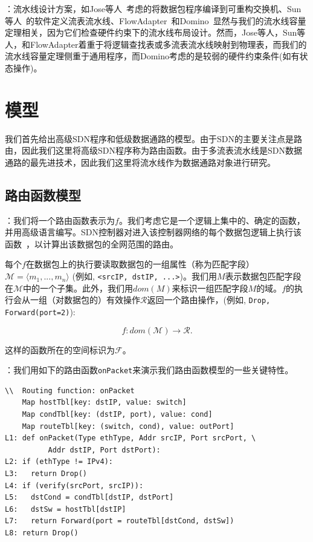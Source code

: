 ：流水线设计方案，如Jose等人~\cite{Jose-et-al}考虑的将数据包程序编译到可重构交换机、Sun等人~\cite{Sun-et-al}的软件定义流表流水线、FlowAdapter~\cite{pan2013flowadapter}和Domino~\cite{sivaraman2016packet}显然与我们的流水线容量定理相关，因为它们检查硬件约束下的流水线布局设计。然而，Jose等人，Sun等人，和FlowAdapter着重于将逻辑查找表或多流表流水线映射到物理表，而我们的流水线容量定理侧重于通用程序，而Domino考虑的是较弱的硬件约束条件(如有状态操作)。


\section{模型}
\label{sec:model-and-main-results}

我们首先给出高级SDN程序和低级数据通路的模型。由于SDN的主要关注点是路由，因此我们这里将高级SDN程序称为路由函数。由于多流表流水线是SDN数据通路的最先进技术，因此我们这里将流水线作为数据通路对象进行研究。

\subsection{路由函数模型}
\label{subsec:function-model}

：我们将一个路由函数表示为$f$。我们考虑它是一个逻辑上集中的、确定的函数，并用高级语言编写。SDN控制器对进入该控制器网络的每个数据包逻辑上执行该函数~\cite{maple}，以计算出该数据包的全网范围的路由。

每个$f$在数据包上的执行要读取数据包的一组属性（称为匹配字段）$\mathcal{M} = \langle m_1, ..., m_n \rangle$ (例如, \texttt{<srcIP, dstIP, ...>})。我们用$M$表示数据包匹配字段在$\mathcal{M}$中的一个子集。此外，我们用$dom(M)$来标识一组匹配字段$M$的域。$f$的执行会从一组（对数据包的）有效操作$\mathcal{R}$返回一个路由操作，(例如, \texttt{Drop, Forward(port=2)}):


\begin{equation*}
f : dom(\mathcal{M}) \rightarrow \mathcal{R}.
\end{equation*}

这样的函数所在的空间标识为$\mathcal{F}$。

：我们用如下的路由函数\texttt{onPacket}来演示我们路由函数模型的一些关键特性。
{\small
\begin{verbatim}
\\  Routing function: onPacket
    Map hostTbl[key: dstIP, value: switch]
    Map condTbl[key: (dstIP, port), value: cond]
    Map routeTbl[key: (switch, cond), value: outPort]
L1: def onPacket(Type ethType, Addr srcIP, Port srcPort, \
          Addr dstIP, Port dstPort):
L2: if (ethType != IPv4):
L3:   return Drop()
L4: if (verify(srcPort, srcIP)):
L5:   dstCond = condTbl[dstIP, dstPort]
L6:   dstSw = hostTbl[dstIP]
L7:   return Forward(port = routeTbl[dstCond, dstSw])
L8: return Drop()
\end{verbatim}
}

